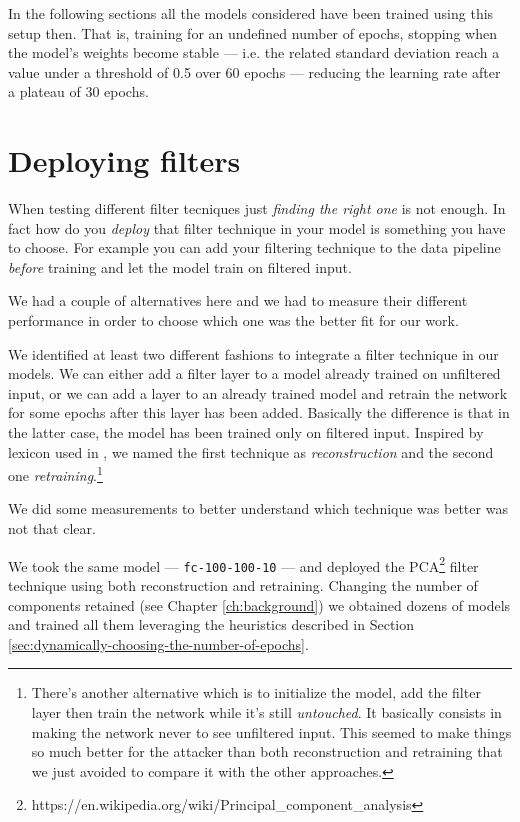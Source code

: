 In the following sections all the models considered have been trained
using this setup then. That is, training for an undefined number of
epochs, stopping when the model's weights become stable --- i.e. the
related standard deviation reach a value under a threshold of 0.5 over
60 epochs --- reducing the learning rate after a plateau of 30 epochs.

\section{Deploying filters}
\label{sec:deploying-filters}

When testing different filter tecniques just \emph{finding the right
  one} is not enough. In fact how do you \emph{deploy} that filter
technique in your model is something you have to choose. For example
you can add your filtering technique to the data pipeline \emph{before}
training and let the model train on filtered input.

We had a couple of alternatives here and we had to measure their
different performance in order to choose which one was the better fit
for our work.

We identified at least two different fashions to integrate a filter
technique in our models. We can either add a filter layer to a model
already trained on unfiltered input, or we can add a layer to an
already trained model and retrain the network for some epochs after
this layer has been added. Basically the difference is that in the latter case, the model has
been trained only on filtered input.
Inspired by lexicon used in \cite{bhagoji2018enhancing}, we named the
first technique as \emph{reconstruction} and the second one
\emph{retraining}.\footnote{There's another alternative which is to
  initialize the model, add the filter layer then train the network
  while it's still \emph{untouched}. It basically consists in making
  the network never to see unfiltered input. This seemed to make things
  so much better for the attacker than both reconstruction and
  retraining that we just avoided to compare it with the other
  approaches.}

We did some measurements to better understand which technique was
better was not that clear.

We took the same model --- \texttt{fc-100-100-10} --- and deployed the
PCA\footnote{https://en.wikipedia.org/wiki/Principal\_component\_analysis}
filter technique using both reconstruction and retraining. Changing
the number of components retained (see Chapter \ref{ch:background}) we
obtained dozens of models and trained all them leveraging the
heuristics described in Section
\ref{sec:dynamically-choosing-the-number-of-epochs}.


